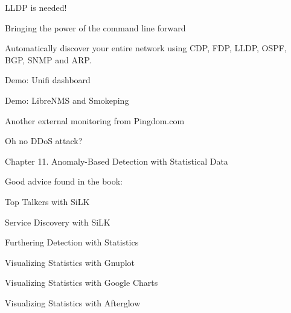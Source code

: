 \documentclass[Screen16to9,17pt]{foils}
\begin{document}

\centerline{LLDP is needed!}



\centerline{Bringing the power of the command line forward}



Automatically discover your entire network using CDP, FDP, LLDP, OSPF, BGP, SNMP and ARP.






\begin{quote}

\end{quote}

\begin{list2}
  \item Demo: Unifi dashboard
  \item Demo: LibreNMS and Smokeping
\end{list2}




\centerline{Another external monitoring from Pingdom.com}





\centerline{Oh no DDoS attack?}




Chapter 11. Anomaly-Based Detection with Statistical Data

Good advice found in the book:
\begin{list2}
\item Top Talkers with SiLK
\item Service Discovery with SiLK
\item Furthering Detection with Statistics
\item Visualizing Statistics with Gnuplot
\item Visualizing Statistics with Google Charts
\item Visualizing Statistics with Afterglow
\end{list2}
\end{document}
